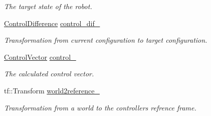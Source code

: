 \begin{DoxyCompactItemize}
\begin{DoxyCompactList}\small\item\em The target state of the robot. \end{DoxyCompactList}\item 
\hyperlink{classController_a75a1e2f93842f65d1263f7d3c2fd8898}{Control\+Difference} \hyperlink{classController_afe3b54c59a80046661f0030a573539d7}{control\+\_\+dif\+\_\+}\hypertarget{classController_afe3b54c59a80046661f0030a573539d7}{}\label{classController_afe3b54c59a80046661f0030a573539d7}

\begin{DoxyCompactList}\small\item\em Transformation from current configuration to target configuration. \end{DoxyCompactList}\item 
\hyperlink{structController_1_1ControlVector}{Control\+Vector} \hyperlink{classController_aaafcd892e9e6080e839a1348a7ef40db}{control\+\_\+}\hypertarget{classController_aaafcd892e9e6080e839a1348a7ef40db}{}\label{classController_aaafcd892e9e6080e839a1348a7ef40db}

\begin{DoxyCompactList}\small\item\em The calculated control vector. \end{DoxyCompactList}\item 
tf\+::\+Transform \hyperlink{classController_aa713beca2ef8152d273bbc6fc38f7fc8}{world2reference\+\_\+}\hypertarget{classController_aa713beca2ef8152d273bbc6fc38f7fc8}{}\label{classController_aa713beca2ef8152d273bbc6fc38f7fc8}

\begin{DoxyCompactList}\small\item\em Transformation from a world to the controllers refrence frame. \end{DoxyCompactList}\end{DoxyCompactItemize}
